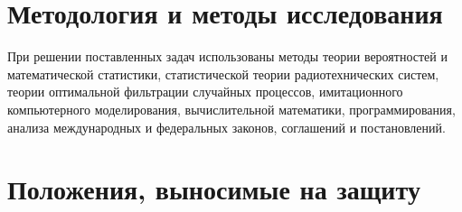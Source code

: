 \section*{Методология и методы исследования}

При решении поставленных задач использованы методы теории вероятностей и математической статистики, статистической теории радиотехнических систем, теории оптимальной фильтрации случайных процессов, имитационного компьютерного моделирования, вычислительной математики, программирования, анализа международных и федеральных законов, соглашений и постановлений.


\section*{Положения, выносимые на защиту}

